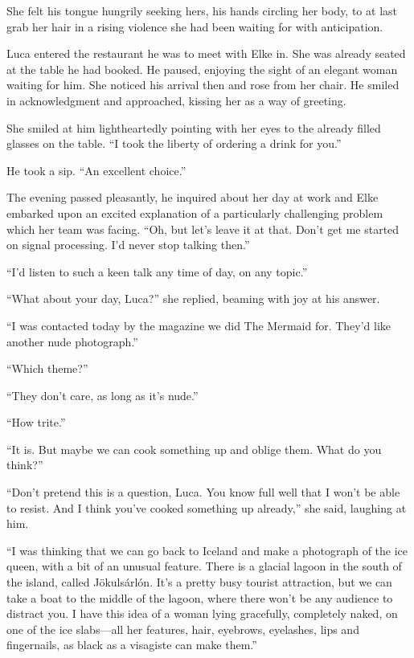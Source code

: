 She felt his tongue hungrily seeking hers, his hands circling her body, to at last grab her hair in a rising violence she had been waiting for with anticipation.

\sectionline

Luca entered the restaurant he was to meet with Elke in. She was already seated at the table he had booked. He paused, enjoying the sight of an elegant woman waiting for him. She noticed his arrival then and rose from her chair. He smiled in acknowledgment and approached, kissing her as a way of greeting.

She smiled at him lightheartedly pointing with her eyes to the already filled glasses on the table. ``I took the liberty of ordering a drink for you.''

He took a sip. ``An excellent choice.''

The evening passed pleasantly, he inquired about her day at work and Elke embarked upon an excited explanation of a particularly challenging problem which her team was facing. ``Oh, but let's leave it at that. Don't get me started on signal processing. I'd never stop talking then.''

``I'd listen to such a keen talk any time of day, on any topic.''

``What about your day, Luca?'' she replied, beaming with joy at his answer.

``I was contacted today by the magazine we did The Mermaid for. They'd like another nude photograph.''

``Which theme?''

``They don't care, as long as it's nude.''

``How trite.''

``It is. But maybe we can cook something up and oblige them. What do you think?''

``Don't pretend this is a question, Luca. You know full well that I won't be able to resist. And I think you've cooked something up already,'' she said, laughing at him.

``I was thinking that we can go back to Iceland and make a photograph of the ice queen, with a bit of an unusual feature. There is a glacial lagoon in the south of the island, called Jökulsárlón. It's a pretty busy tourist attraction, but we can take a boat to the middle of the lagoon, where there won't be any audience to distract you. I have this idea of a woman lying gracefully, completely naked, on one of the ice slabs---all her features, hair, eyebrows, eyelashes, lips and fingernails, as black as a visagiste can make them.''

